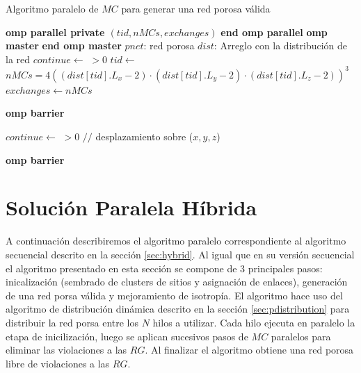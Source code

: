 \begin{algorithm}
\caption{Algoritmo paralelo de $MC$ para generar una red porosa válida}\label{alg:pvalidnet}
\begin{algorithmic}[1]
    {\textbf{omp parallel private $(tid,nMCs,exchanges)$}}
    {\textbf{end omp parallel}}    
    {\textbf{omp master}}
    {\textbf{end omp master}}
\Require $pnet$: red porosa
\Require $dist$: Arreglo con la distribución de la red
\State $continue \gets$  $ > 0$
\ompparallel
	\State $tid \gets $ 
	\State $nMCs=4(( dist[tid].L_x  - 2) \cdot (dist[tid].L_y - 2) \cdot (dist[tid].L_z - 2))^3$
		\State $exchanges \gets nMCs$
			\State {}
				\State {}
			\EndIf
		\EndWhile
		
		\State \textbf{omp barrier}
		
		\ompmaster
			\State $continue \gets$  $ > 0$		
				\State {} {$//$ desplazamiento sobre ($x,y,z$)}
			\EndIf
		\eompmaster

		\State \textbf{omp barrier}
	\EndWhile
\eompparallel
\end{algorithmic}
\end{algorithm}

\section{Solución Paralela Híbrida}
\label{sec:ph}
A continuación describiremos el algoritmo paralelo correspondiente al algoritmo secuencial descrito en la secci\'on \ref{sec:hybrid}. Al 
igual que en su versi\'on secuencial el algoritmo presentado en esta secci\'on se compone de 3 principales pasos: inicalizaci\'on (sembrado 
de clusters de sitios y asignación de enlaces), generación de una red porsa v\'alida y mejoramiento de isotropía. El algoritmo hace uso 
del algoritmo de distribución dinámica descrito en la sección \ref{sec:pdistribution} para distribuir la red porsa entre los $N$ hilos 
a utilizar. Cada hilo ejecuta en paralelo la etapa de inicilización, luego  se aplican sucesivos pasos de $MC$ paralelos para eliminar 
las violaciones a las $RG$. Al finalizar el algoritmo obtiene una red porosa libre de violaciones a las $RG$.

